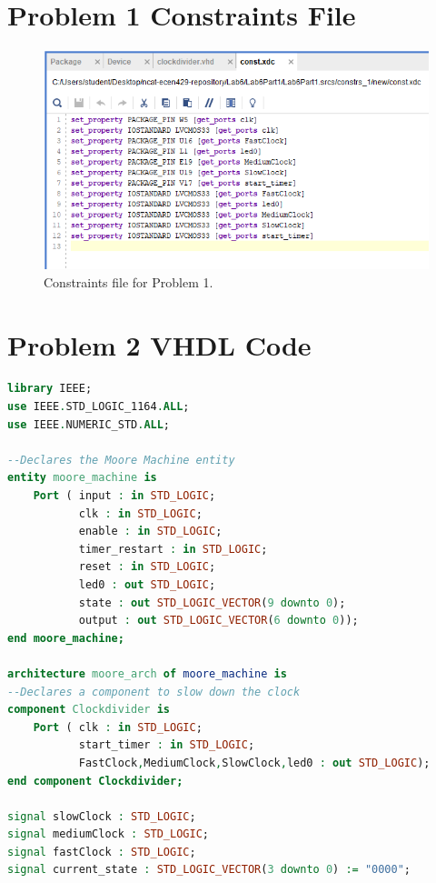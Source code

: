 \documentclass[11pt]{article}
\begin{document}
\begin{appendices}
\section{Problem 1 Constraints File}
\begin{center}
\begin{figure}[H]
	\includegraphics[scale=1]{./images/Lab6Part1Const.png}
	\caption{\label{fig:Prob1Const}Constraints file for Problem 1.}
\end{figure}
\end{center}

\section{Problem 2 VHDL Code}
\begin{lstlisting}[language=VHDL]
library IEEE;
use IEEE.STD_LOGIC_1164.ALL;
use IEEE.NUMERIC_STD.ALL;

--Declares the Moore Machine entity
entity moore_machine is
    Port ( input : in STD_LOGIC;
           clk : in STD_LOGIC;
           enable : in STD_LOGIC;
           timer_restart : in STD_LOGIC;
           reset : in STD_LOGIC;
           led0 : out STD_LOGIC;
           state : out STD_LOGIC_VECTOR(9 downto 0);
           output : out STD_LOGIC_VECTOR(6 downto 0));
end moore_machine;

architecture moore_arch of moore_machine is
--Declares a component to slow down the clock
component Clockdivider is
    Port ( clk : in STD_LOGIC;
           start_timer : in STD_LOGIC;
           FastClock,MediumClock,SlowClock,led0 : out STD_LOGIC);
end component Clockdivider;

signal slowClock : STD_LOGIC;
signal mediumClock : STD_LOGIC;
signal fastClock : STD_LOGIC;
signal current_state : STD_LOGIC_VECTOR(3 downto 0) := "0000";


\end{lstlisting}
\end{appendices}
\end{document}
